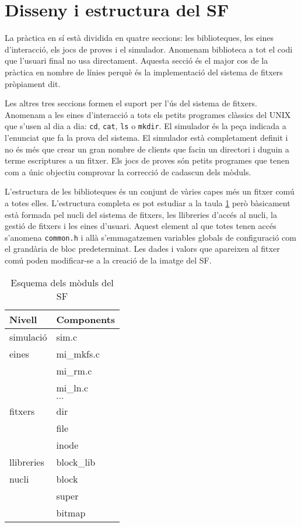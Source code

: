
\section{Disseny i estructura del SF}

La pràctica en sí està dividida en quatre seccions: les biblioteques, les eines
d'interacció, els jocs de proves i el simulador. Anomenam biblioteca a tot el
codi que l'usuari final no usa directament. Aquesta secció és el major cos de
la pràctica en nombre de línies perquè és la implementació del sistema de
fitxers pròpiament dit.

Les altres tres seccions formen el suport per l'ús del sistema de
fitxers. Anomenam a les eines d'interacció a tots els petits programes clàssics
del UNIX que s'usen al dia a dia: \verb+cd+, \verb+cat+, \verb+ls+ o
\verb+mkdir+. El simulador és la peça indicada a l'enunciat que fa la prova del
sistema. El simulador està completament definit i no és més que crear un gran
nombre de clients que facin un directori i duguin a terme escriptures a un
fitxer. Els jocs de proves són petits programes que tenen com a únic objectiu
comprovar la correcció de cadascun dels mòduls.

L'estructura de les biblioteques és un conjunt de vàries capes més un fitxer
comú a totes elles. L'estructura completa es pot estudiar a la taula
\ref{capes:simple} però bàsicament està formada pel nucli del sistema de
fitxers, les llibreries d'accés al nucli, la gestió de fitxers i les eines
d'usuari. Aquest element al que totes tenen accés s'anomena \verb+common.h+ i
allà s'emmagatzemen variables globals de configuració com el grandària de bloc
predeterminat. Les dades i valors que apareixen al fitxer comú poden
modificar-se a la creació de la imatge del SF.

\begin{table}
\centering
\begin{tabular}{|ll|}
\textbf{Nivell} & \textbf{Components} \\
\hline
simulació   & sim.c \\
\hline
eines & mi\_mkfs.c \\
      & mi\_rm.c \\
      & mi\_ln.c \\
      & $\cdots$ \\
\hline
fitxers & dir \\
        & file \\
        & inode \\
\hline
llibreries & block\_lib \\
\hline
nucli & block \\
      & super \\
      & bitmap \\
\hline
\end{tabular}
\caption{Esquema dels mòduls del SF}
\label{capes:simple}
\end{table}

